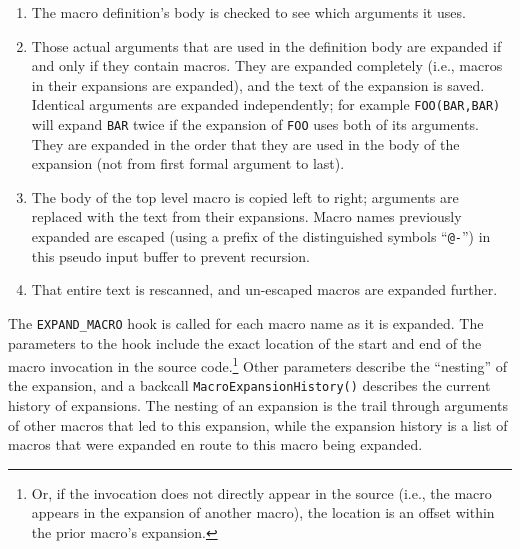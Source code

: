 \documentclass{article}
\newcommand{\ie}{i.e.,}
\begin{document}
\begin{enumerate}
\item The macro definition's body is checked to see which arguments it uses.
\item Those actual arguments that are used in the definition body are
      expanded if and only if they contain macros.  They are expanded
      completely (\ie{} macros in their expansions are expanded), and
      the text of the expansion is saved.  Identical arguments are
      expanded independently; for example \texttt{FOO(BAR,BAR)} will
      expand \texttt{BAR} twice if the expansion of \texttt{FOO} uses
      both of its arguments.  They are expanded in the order that they
      are used in the body of the expansion (not from first formal
      argument to last).
\item The body of the top level macro is copied left to right; arguments
      are replaced with the text from their expansions.  Macro names
      previously expanded are escaped (using a prefix of the
      distinguished symbols ``\texttt{@-}'') in this pseudo input buffer
      to prevent recursion.
\item That entire text is rescanned, and un-escaped macros are expanded
      further.
\end{enumerate}

\noindent The \texttt{EXPAND\_MACRO} hook is called for each macro name as it is
expanded.  The parameters to the hook include the exact location of the
start and end of the macro invocation in the source code.\footnote{Or,
  if the invocation does not directly appear in the source (\ie{} the
  macro appears in the expansion of another macro), the location is an
  offset within the prior macro's expansion.}  Other parameters
describe the ``nesting'' of the expansion, and a backcall
\texttt{Macro\-Expansion\-History()} describes the current history of
expansions.  The nesting of an expansion is the trail through arguments
of other macros that led to this expansion, while the expansion history
is a list of macros that were expanded en route to this macro being
expanded.
\end{document}
